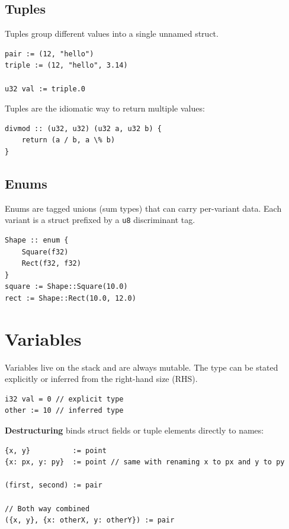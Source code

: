 \subsection{Tuples}
Tuples group different values into a single unnamed struct.

\begin{lstlisting}[style=zinc, caption={Tuple construction and access}]
pair := (12, "hello")
triple := (12, "hello", 3.14)

u32 val := triple.0
\end{lstlisting}

Tuples are the idiomatic way to return multiple values:

\begin{lstlisting}[style=zinc, caption={Multiple return values}]
divmod :: (u32, u32) (u32 a, u32 b) {
    return (a / b, a \% b)
}
\end{lstlisting}

\subsection{Enums}
Enums are tagged unions (sum types) that can carry per-variant data.
Each variant is a struct prefixed by a \texttt{u8} discriminant tag.

\begin{lstlisting}[style=zinc, caption={Enum declaration and construction}]
Shape :: enum {
    Square(f32)
    Rect(f32, f32)
}
square := Shape::Square(10.0)
rect := Shape::Rect(10.0, 12.0)
\end{lstlisting}

\section{Variables}

Variables live on the stack and are always mutable.
The type can be stated explicitly or inferred from the right-hand size (RHS).

\begin{lstlisting}[style=zinc, caption={Variable declarations}]
i32 val = 0 // explicit type
other := 10 // inferred type
\end{lstlisting}

\textbf{Destructuring} binds struct fields or tuple elements directly to names:

\begin{lstlisting}[style=zinc, caption={Destructuring}]
{x, y}          := point
{x: px, y: py}  := point // same with renaming x to px and y to py

(first, second) := pair

// Both way combined
({x, y}, {x: otherX, y: otherY}) := pair
\end{lstlisting}

